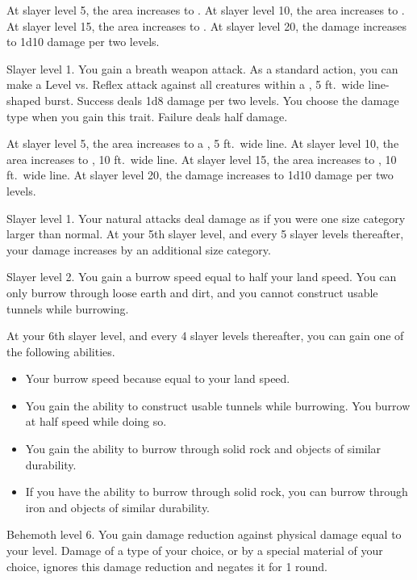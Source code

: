     At slayer level 5, the area increases to \areamed.
    At slayer level 10, the area increases to \arealarge.
    At slayer level 15, the area increases to \areahuge.
    At slayer level 20, the damage increases to 1d10 damage per two levels.

    \featpre Slayer level 1.
    \featben You gain a breath weapon attack.
    As a standard action, you can make a Level vs. Reflex attack against all creatures within a \areamed, 5 ft.\ wide line-shaped burst.
    Success deals 1d8 damage per two levels.
    You choose the damage type when you gain this trait.
    Failure deals half damage.

    At slayer level 5, the area increases to a \arealarge, 5 ft.\ wide line.
    At slayer level 10, the area increases to \arealarge, 10 ft.\ wide line.
    At slayer level 15, the area increases to \areahuge, 10 ft.\ wide line.
    At slayer level 20, the damage increases to 1d10 damage per two levels.

    \featpre Slayer level 1.
    \featben Your natural attacks deal damage as if you were one size category larger than normal.
    At your 5th slayer level, and every 5 slayer levels thereafter, your damage increases by an additional size category.

    \featpre Slayer level 2.
    \featben You gain a burrow speed equal to half your land speed.
    You can only burrow through loose earth and dirt, and you cannot construct usable tunnels while burrowing.

    At your 6th slayer level, and every 4 slayer levels thereafter, you can gain one of the following abilities.
    \begin{itemize}
        \item Your burrow speed because equal to your land speed.
        \item You gain the ability to construct usable tunnels while burrowing.
            You burrow at half speed while doing so.
        \item You gain the ability to burrow through solid rock and objects of similar durability.
        \item If you have the ability to burrow through solid rock, you can burrow through iron and objects of similar durability.
    \end{itemize}

    \featpre Behemoth level 6.
    \featben You gain damage reduction against physical damage equal to your level.
    Damage of a type of your choice, or by a special material of your choice, ignores this damage reduction and negates it for 1 round.

